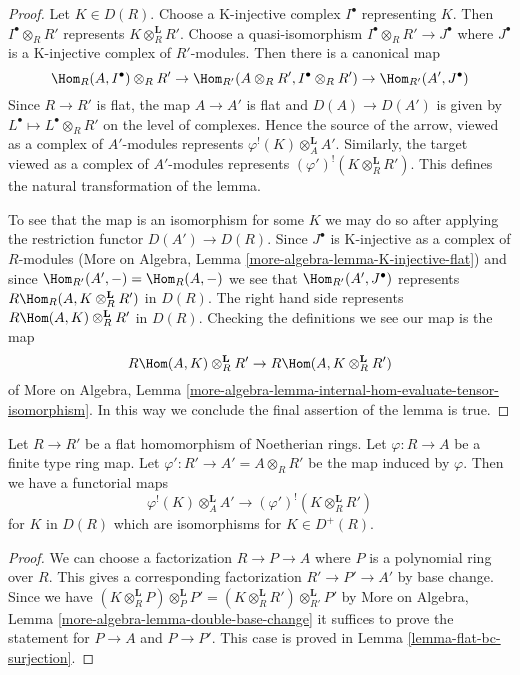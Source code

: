 \begin{proof}
Let $K \in D(R)$. Choose a K-injective complex $I^\bullet$ representing
$K$. Then $I^\bullet \otimes_R R'$ represents $K \otimes_R^\mathbf{L} R'$.
Choose a quasi-isomorphism $I^\bullet \otimes_R R' \to J^\bullet$
where $J^\bullet$ is a K-injective complex of $R'$-modules.
Then there is a canonical map
$$
\Hom_R(A, I^\bullet) \otimes_R R' \to
\Hom_{R'}(A \otimes_R R', I^\bullet \otimes_R R') \to
\Hom_{R'}(A', J^\bullet)
$$
Since $R \to R'$ is flat, the map $A \to A'$ is flat and
$D(A) \to D(A')$ is given by $L^\bullet \mapsto L^\bullet \otimes_R R'$
on the level of complexes. Hence the source of the arrow,
viewed as a complex of $A'$-modules represents
$\varphi^!(K) \otimes_A^\mathbf{L} A'$.
Similarly, the target viewed as a complex of $A'$-modules
represents $(\varphi')^!(K \otimes_R^\mathbf{L} R')$.
This defines the natural transformation of the lemma.

\medskip\noindent
To see that the map is an isomorphism for some $K$ we may do so after
applying the restriction functor $D(A') \to D(R)$.
Since $J^\bullet$ is K-injective as a complex of $R$-modules
(More on Algebra, Lemma \ref{more-algebra-lemma-K-injective-flat})
and since $\Hom_{R'}(A', -) = \Hom_R(A, -)$ we see that
$\Hom_{R'}(A', J^\bullet)$ represents
$R\Hom_R(A, K \otimes_R^\mathbf{L} R')$ in $D(R)$.
The right hand side represents $R\Hom(A, K) \otimes_R^\mathbf{L} R'$
in $D(R)$. Checking the definitions we see our map is the map
$$
R\Hom(A, K) \otimes_R^\mathbf{L} R' \to R\Hom(A, K \otimes_R^\mathbf{L} R')
$$
of More on Algebra, Lemma
\ref{more-algebra-lemma-internal-hom-evaluate-tensor-isomorphism}.
In this way we conclude the final assertion of the lemma is true.
\end{proof}

\begin{lemma}
\label{lemma-flat-bc}
Let $R \to R'$ be a flat homomorphism of Noetherian rings.
Let $\varphi : R \to A$ be a finite type ring map.
Let $\varphi' : R' \to A' = A \otimes_R R'$ be the map induced by $\varphi$.
Then we have a functorial maps
$$
\varphi^!(K) \otimes_A^\mathbf{L} A' \longrightarrow
(\varphi')^!(K \otimes_R^\mathbf{L} R')
$$
for $K$ in $D(R)$ which are isomorphisms for $K \in D^+(R)$.
\end{lemma}

\begin{proof}
We can choose a factorization $R \to P \to A$ where $P$ is a polynomial
ring over $R$. This gives a corresponding factorization
$R' \to P' \to A'$ by base change. Since we have
$(K \otimes_R^\mathbf{L} P) \otimes_P^\mathbf{L} P' =
(K \otimes_R^\mathbf{L} R') \otimes_{R'}^\mathbf{L} P'$
by More on Algebra, Lemma \ref{more-algebra-lemma-double-base-change}
it suffices to prove the statement for
$P \to A$ and $P \to P'$. This case is proved in
Lemma \ref{lemma-flat-bc-surjection}.
\end{proof}

